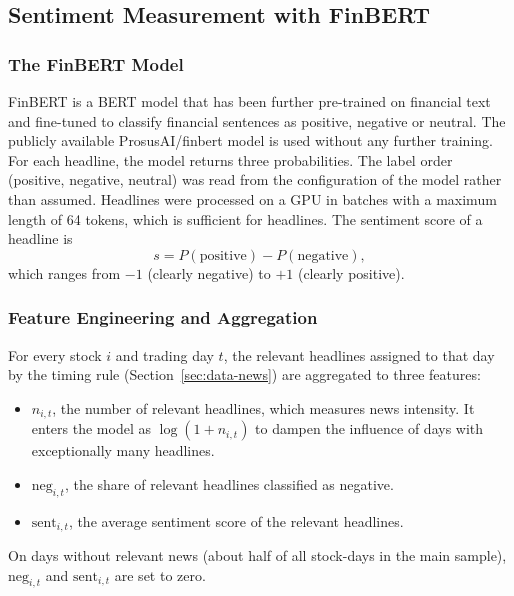 \documentclass[12pt,a4paper]{article}
\begin{document}
\subsection{Sentiment Measurement with FinBERT}\label{sec:method-finbert}
\subsubsection{The FinBERT Model}\label{sec:finbert-model}
FinBERT \parencite{araci2019} is a BERT model \parencite{devlin2019} that has been further pre-trained on financial text and fine-tuned to classify financial sentences as positive, negative or neutral. The publicly available ProsusAI/finbert model is used without any further training. For each headline, the model returns three probabilities. The label order (positive, negative, neutral) was read from the configuration of the model rather than assumed. Headlines were processed on a GPU in batches with a maximum length of 64 tokens, which is sufficient for headlines. The sentiment score of a headline is
\begin{equation}
  s = P(\text{positive}) - P(\text{negative}),
  \label{eq:sentiment}
\end{equation}
which ranges from $-1$ (clearly negative) to $+1$ (clearly positive).

\subsubsection{Feature Engineering and Aggregation}\label{sec:features}
For every stock $i$ and trading day $t$, the relevant headlines assigned to that day by the timing rule (Section~\ref{sec:data-news}) are aggregated to three features:
\begin{itemize}
  \item $n_{i,t}$, the number of relevant headlines, which measures news intensity. It enters the model as $\log(1 + n_{i,t})$ to dampen the influence of days with exceptionally many headlines.
  \item $\text{neg}_{i,t}$, the share of relevant headlines classified as negative.
  \item $\text{sent}_{i,t}$, the average sentiment score of the relevant headlines.
\end{itemize}
On days without relevant news (about half of all stock-days in the main sample), $\text{neg}_{i,t}$ and $\text{sent}_{i,t}$ are set to zero.
\end{document}
